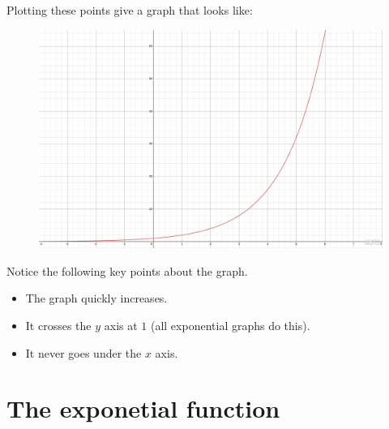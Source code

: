 \documentclass[
  a4paper,
]{scrbook}
\providecommand{\tightlist}{%
  \setlength{\itemsep}{0pt}\setlength{\parskip}{0pt}}\usepackage{longtable,booktabs,array}
\begin{document}
Plotting these points give a graph that looks like:

\begin{figure}

{\centering 

\href{https://www.desmos.com/calculator/u1nuc4eumz?embed}{\includegraphics{./10-exponetial_function_files/figure-pdf/unnamed-chunk-1-1.png}}

}

\end{figure}

Notice the following key points about the graph.

\begin{tcolorbox}[enhanced jigsaw, opacityback=0, left=2mm, toptitle=1mm, title=\textcolor{quarto-callout-note-color}{\faInfo}\hspace{0.5em}{Note}, breakable, colbacktitle=quarto-callout-note-color!10!white, opacitybacktitle=0.6, bottomtitle=1mm, arc=.35mm, colback=white, leftrule=.75mm, bottomrule=.15mm, colframe=quarto-callout-note-color-frame, rightrule=.15mm, titlerule=0mm, toprule=.15mm, coltitle=black]

\begin{itemize}
\tightlist
\item
  The graph quickly increases.
\item
  It crosses the \(y\) axis at \(1\) (all exponential graphs do this).
\item
  It never goes under the \(x\) axis.
\end{itemize}

\end{tcolorbox}

\hypertarget{the-exponetial-function}{%
\section{The exponetial function}\label{the-exponetial-function}}
\end{document}
